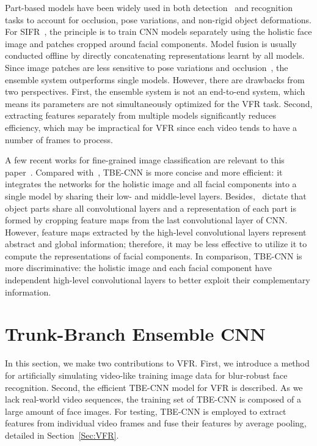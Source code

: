 \documentclass[10pt,journal,cspaper,compsoc]{IEEEtran}
\begin{document}
Part-based models have been widely used in both detection~\cite{ouyang2013joint,savalle2014deformable,girshick2015deformable,wan2015end,yang2016end}
and recognition~\cite{zhang2014part,zhang2015fine,huang2016part,lin2015bilinear,max2015spatial} tasks to account for occlusion, pose variations, and non-rigid object deformations.
For SIFR~\cite{sun2014deep,liu2015targeting},
the principle is to train CNN models separately using the holistic face image and patches cropped around facial components.
Model fusion is usually conducted offline by directly concatenating representations learnt by all models.
Since image patches are less sensitive to pose variations and occlusion~\cite{arashloo2011energy}, the ensemble system outperforms single models.
However, there are drawbacks from two perspectives. First, the ensemble system is not an end-to-end system,
which means its parameters are not simultaneously optimized for the VFR task.
Second, extracting features separately from multiple models significantly reduces efficiency,
which may be impractical for VFR since each video tends to have a number of frames to process.

A few recent works for fine-grained image classification are relevant to this paper~\cite{zhang2014part,zhang2015fine,huang2016part}.
Compared with~\cite{huang2016part}, TBE-CNN is more concise and more efficient:
it integrates the networks for the holistic image and all facial components into a single model by sharing their low- and middle-level layers.
Besides,~\cite{zhang2014part,zhang2015fine,huang2016part} dictate that object parts share all convolutional layers
and a representation of each part is formed by cropping feature maps from the last convolutional layer of CNN.
However, feature maps extracted by the high-level convolutional layers represent abstract and global information;
therefore, it may be less effective to utilize it to compute the representations of facial components.
In comparison, TBE-CNN is more discriminative: the holistic image and each facial component have independent high-level convolutional layers to better exploit their complementary information.



\section{Trunk-Branch Ensemble CNN}
\label{Sec:TBECNN}
In this section, we make two contributions to VFR.
First, we introduce a method for artificially simulating video-like training image data for blur-robust face recognition.
Second, the efficient TBE-CNN model for VFR is described.
As we lack real-world video sequences, the training set of TBE-CNN is composed of a large amount of face images.
For testing, TBE-CNN is employed to extract features from individual video frames and fuse their features by average pooling,
detailed in Section~\ref{Sec:VFR}.
\end{document}
